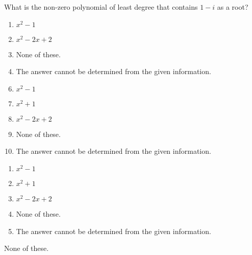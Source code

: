 

  What is the non-zero polynomial of least degree that contains $1-i$ as a root?



\ifsat
	\begin{enumerate}[label=\Alph*)]
		\item   $x^{2}-1$
		\item  $x^{2}-2x+2$
		\item  None of these.%
		\item  The answer cannot be determined from the given information.
	\end{enumerate}
\else
\fi

\ifacteven
	\begin{enumerate}[label=\textbf{\Alph*.},itemsep=\fill,align=left]
		\setcounter{enumii}{5}
		\item   $x^{2}-1$
		\item  $x^{2}+1$
		\item  $x^{2}-2x+2$
		\addtocounter{enumii}{1}
		\item  None of these.%
		\item  The answer cannot be determined from the given information.
	\end{enumerate}
\else
\fi

\ifactodd
	\begin{enumerate}[label=\textbf{\Alph*.},itemsep=\fill,align=left]
		\item   $x^{2}-1$
		\item  $x^{2}+1$
		\item  $x^{2}-2x+2$
		\item  None of these.%
		\item  The answer cannot be determined from the given information.
	\end{enumerate}
\else
\fi

\ifgridin
  None of these.%
		
\else
\fi

